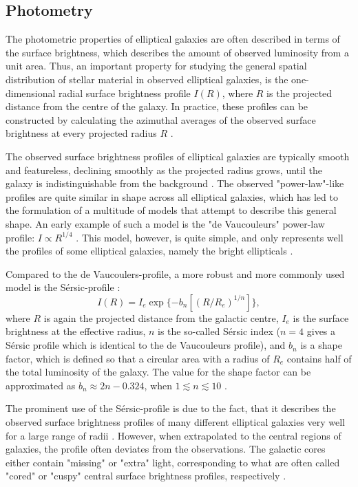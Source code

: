 \documentclass[english, twoside]{HYgradu}
\begin{document}
\subsection{Photometry} \label{section:ellip_photo}

The photometric properties of elliptical galaxies are often described in terms of the surface brightness, which describes the amount of observed luminosity from a unit area. Thus, an important property for studying the general spatial distribution of stellar material in observed elliptical galaxies, is the one-dimensional radial surface brightness profile $I(R)$, where $R$ is the projected distance from the centre of the galaxy. In practice, these profiles can be constructed by calculating the azimuthal averages of the observed surface brightness at every projected radius $R$ \citep{MerrittBook}.

The observed surface brightness profiles of elliptical galaxies are typically smooth and featureless, declining smoothly as the projected radius grows, until the galaxy is indistinguishable from the background \citep{BinneyTremaine}. The observed "power-law"-like profiles are quite similar in shape across all elliptical galaxies, which has led to the formulation of a multitude of models that attempt to describe this general shape. An early example of such a model is the "de Vaucouleurs" power-law profile: $I \propto R^{1/4}$ \citep{deVaucouleurs1948}. This model, however, is quite simple, and only represents well the profiles of some elliptical galaxies, namely the bright ellipticals \citep{MerrittBook}. 

Compared to the de Vaucoulers-profile, a more robust and more commonly used model is the Sérsic-profile \citep{Sersic1968}:
\begin{equation}
I (R) = I_e \exp \{ -b_n \left[ (R / R_e)^{1/n} \right] \},
\end{equation}
where $R$ is again the projected distance from the galactic centre, $I_e$ is the surface brightness at the effective radius, $n$ is the so-called Sérsic index ($n=4$ gives a Sérsic profile which is identical to the de Vaucouleurs profile), and $b_n$ is a shape factor, which is defined so that a circular area with a radius of $R_e$ contains half of the total luminosity of the galaxy. The value for the shape factor can be approximated as $b_n \approx 2n - 0.324$, when $1 \lesssim n \lesssim 10$ \citep{BinneyTremaine}. 

The prominent use of the Sérsic-profile is due to the fact, that it describes the observed surface brightness profiles of many different elliptical galaxies very well for a large range of radii \citep{MerrittBook}. However, when extrapolated to the central regions of galaxies, the profile often deviates from the observations. The galactic cores either contain "missing" or "extra" light, corresponding to what are often called "cored" or "cuspy" central surface brightness profiles, respectively \citep[e.g.][]{Kormendy2009}.
\end{document}
